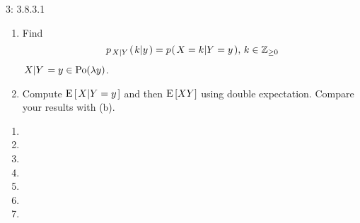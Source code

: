 \documentclass[a4paper,twoside=false,abstract=false,numbers=noenddot,
titlepage=false,headings=small,parskip=half,version=last]{scrartcl}
\begin{document}
\begin{exercise}{3: 3.8.3.1}
\begin{enumerate}
        \item Find
            \begin{equation}
                p_{\left. X \middle\vert Y \right.} (\left. k \middle\vert y \right.) =
                p_{} (\left. X=k \middle\vert Y=y \right.), \, k\in\mathbb{Z}_{\ge 0}
            \end{equation}
            \Answer $\left. X \middle\vert Y \right. = y\in\text{Po}(\lambda y)$.

        \item Compute ${\rm E}\,[\left. X \middle\vert Y=y \right.]$ and then
            ${\rm E}\,[XY]$ using double expectation.
            Compare your results with (b).

    \end{enumerate}
\end{exercise}
\begin{solution}
    \begin{enumerate}
        \item
        \item
        \item
        \item
        \item
        \item
        \item
    \end{enumerate}
\end{solution}
\pagebreak

\end{document}
